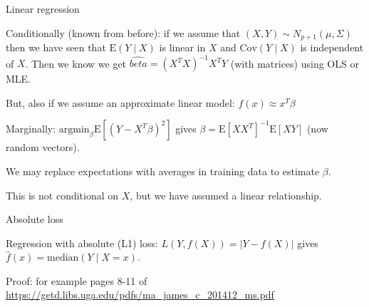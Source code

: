 \documentclass[
  ignorenonframetext,
]{beamer}
\begin{document}
\begin{frame}

\begin{block}{Linear regression}

Conditionally (known from before): if we assume that
\((X,Y) \sim N_{p+1}(\mu,\Sigma)\) then we have seen that
\(\text{E}(Y\mid X)\) is linear in \(X\) and \(\text{Cov}(Y \mid X)\) is
independent of \(X\). Then we know we get
\(\hat{beta}=(X^TX)^{-1}X^T Y\) (with matrices) using OLS or MLE.

But, also if we assume an approximate linear model:
\(f(x)\approx x^T \beta\)

Marginally: \(\text{argmin}_{\beta} \text{E}[(Y-X^T\beta)^2]\) gives
\(\beta=\text{E}[X X^T]^{-1}\text{E}[XY]\) (now random vectors).

We may replace expectations with averages in training data to estimate
\(\beta\).

This is not conditional on \(X\), but we have assumed a linear
relationship.

\end{block}

\end{frame}

\begin{frame}

\begin{block}{Absolute loss}

Regression with absolute (L1) loss: \(L(Y,f(X))=\lvert Y-f(X) \rvert\)
gives \(\hat{f}(x)=\text{median}(Y\mid X=x)\).

Proof: for example pages 8-11 of
\url{https://getd.libs.uga.edu/pdfs/ma_james_c_201412_ms.pdf}

\end{block}

\end{frame}
\end{document}
